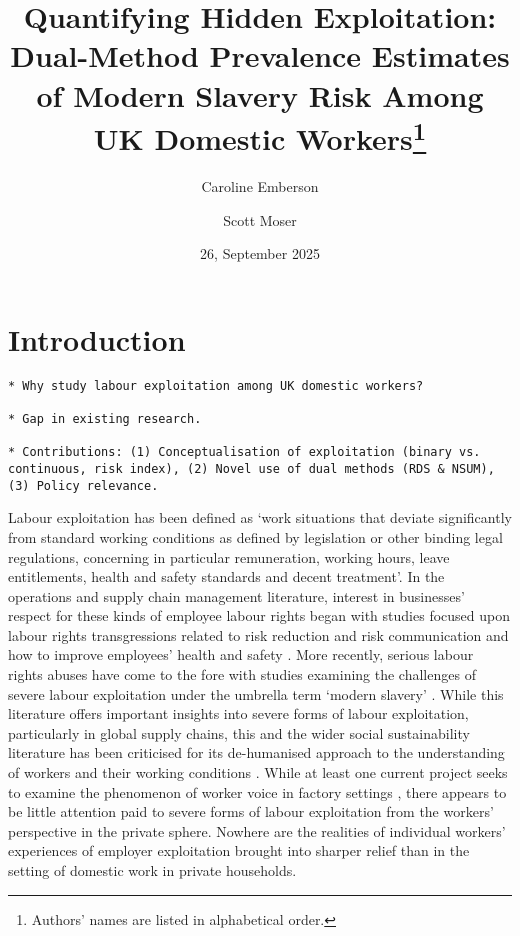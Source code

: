 \documentclass[
  12pt,
  letterpaper,
  DIV=11,
  numbers=noendperiod]{scrartcl}
\title{Quantifying Hidden Exploitation: Dual-Method Prevalence Estimates
of Modern Slavery Risk Among UK Domestic Workers\footnote{Authors' names
  are listed in alphabetical order.}}
\author{Caroline Emberson \and Scott Moser}
\date{26, September 2025}
\theoremstyle{plain}
\theoremstyle{definition}
\renewcommand*\contentsname{Table of contents}
\newcommand\contentsname{Table of contents}
\begin{document}
\maketitle

\renewcommand*\contentsname{Table of contents}
{
\hypersetup{linkcolor=}
\setcounter{tocdepth}{3}
\tableofcontents
}

\newpage

\section{Introduction}\label{introduction}

\begin{verbatim}
* Why study labour exploitation among UK domestic workers?
    
* Gap in existing research.
    
* Contributions: (1) Conceptualisation of exploitation (binary vs. continuous, risk index), (2) Novel use of dual methods (RDS & NSUM), (3) Policy relevance.
\end{verbatim}

Labour exploitation has been defined as `work situations that deviate 
significantly from standard working conditions as defined by legislation
or other binding legal regulations, concerning in particular
remuneration, working hours, leave entitlements, health and safety
standards and decent treatment'\autocite[10]{european_union_for_fundamental_rights_severe_2015}. In the operations and supply chain management literature,
interest in businesses' respect for these kinds of employee labour rights began with
studies focused upon labour rights transgressions related to risk
reduction and risk communication and how to improve
employees' health and safety \autocite{chinander_aligning_2001,wolf_operationalizing_2001}. More recently, 
serious labour rights abuses have come to the fore with studies
examining the challenges of severe labour exploitation under the umbrella term `modern slavery' \autocite{gold_modern_2015,new_modern_2015,benstead_horizontal_2018,stevenson_modern_2018}. While this literature
offers important insights into severe forms of labour exploitation, particularly
in global supply chains, this and the wider social sustainability literature has
been criticised for its de-humanised approach to the understanding
of workers and their working conditions \autocite{soundararajan_humanizing_2021}. While at least one current
project seeks to examine the phenomenon of worker voice in factory
settings  \autocite{leverhulme_trust_research_2022}, there appears to be little attention paid to severe forms of labour exploitation from the workers' perspective in the private sphere. Nowhere are the realities of individual workers' experiences of employer exploitation brought into sharper relief than in the setting of domestic
work in private households.
\end{document}
